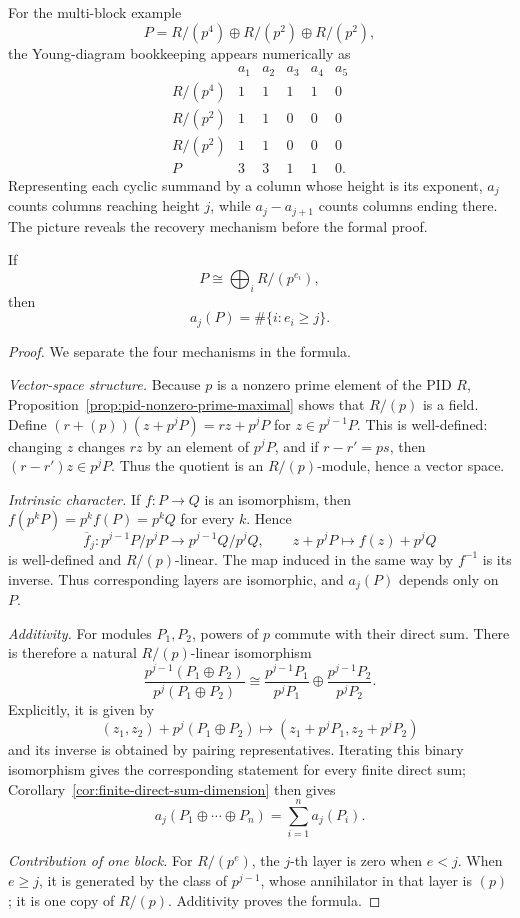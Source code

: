 For the multi-block example
\[
P=R/(p^4)\oplus R/(p^2)\oplus R/(p^2),
\]
the Young-diagram bookkeeping appears numerically as
\[
\begin{array}{c|ccccc}
 &a_1&a_2&a_3&a_4&a_5\\ \hline
R/(p^4)&1&1&1&1&0\\
R/(p^2)&1&1&0&0&0\\
R/(p^2)&1&1&0&0&0\\ \hline
P&3&3&1&1&0.
\end{array}
\]
Representing each cyclic summand by a column whose height is its exponent,
\(a_j\) counts columns reaching height \(j\), while \(a_j-a_{j+1}\) counts
columns ending there.  The picture reveals the recovery mechanism before the
formal proof.

\begin{lemma}\label{lem:primary-layers}
If
\[
P\cong\bigoplus_iR/(p^{e_i}),
\]
then
\[
a_j(P)=\#\{i:e_i\geq j\}.
\]
\end{lemma}
\begin{proof}
We separate the four mechanisms in the formula.

\emph{Vector-space structure.}
Because \(p\) is a nonzero prime element of the PID \(R\),
Proposition~\ref{prop:pid-nonzero-prime-maximal} shows that \(R/(p)\) is a
field.
Define \((r+(p))(z+p^jP)=rz+p^jP\) for \(z\in p^{j-1}P\).  This is
well-defined: changing \(z\) changes \(rz\) by an element of \(p^jP\), and
if \(r-r'=ps\), then \((r-r')z\in p^jP\).  Thus the quotient is an
\(R/(p)\)-module, hence a vector space.

\emph{Intrinsic character.}
If \(f:P\to Q\) is an isomorphism, then
\(f(p^kP)=p^kf(P)=p^kQ\) for every \(k\). Hence
\[
\overline f_j:p^{j-1}P/p^jP\longrightarrow p^{j-1}Q/p^jQ,
\qquad z+p^jP\longmapsto f(z)+p^jQ
\]
is well-defined and \(R/(p)\)-linear. The map induced in the same way by
\(f^{-1}\) is its inverse. Thus corresponding layers are isomorphic, and
\(a_j(P)\) depends only on \(P\).

\emph{Additivity.}
For modules \(P_1,P_2\), powers of \(p\) commute with their direct sum. There
is therefore a natural \(R/(p)\)-linear isomorphism
\[
\frac{p^{j-1}(P_1\oplus P_2)}{p^j(P_1\oplus P_2)}
\cong
\frac{p^{j-1}P_1}{p^jP_1}\oplus
\frac{p^{j-1}P_2}{p^jP_2}.
\]
Explicitly, it is given by
\[
(z_1,z_2)+p^j(P_1\oplus P_2)
\longmapsto (z_1+p^jP_1,z_2+p^jP_2)
\]
and its inverse is obtained by pairing representatives. Iterating this binary
isomorphism gives the corresponding statement for every finite direct sum;
Corollary~\ref{cor:finite-direct-sum-dimension} then gives
\[
a_j(P_1\oplus\cdots\oplus P_n)=\sum_{i=1}^n a_j(P_i).
\]

\emph{Contribution of one block.}
For \(R/(p^e)\), the \(j\)-th layer is zero when \(e<j\).  When \(e\geq j\),
it is generated by the class of \(p^{j-1}\), whose annihilator in that layer
is \((p)\); it is one copy of \(R/(p)\).  Additivity proves the formula.
\end{proof}


